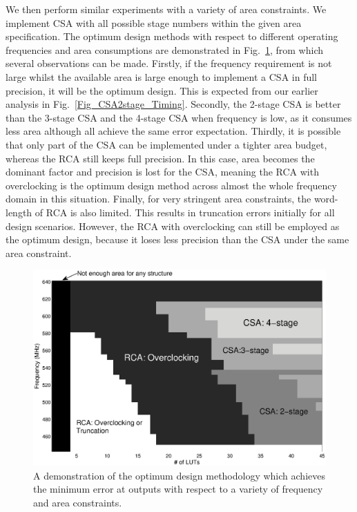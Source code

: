 \documentclass[prodmode,acmtrets]{acmsmall} %
\begin{document}
We then perform similar experiments with a variety of area constraints. We implement CSA with all possible stage numbers within the given area specification. The optimum design methods with respect to different operating frequencies and area consumptions are demonstrated in Fig.~\ref{Fig_CSA_Tradeoff}, from which several observations can be made. Firstly, if the frequency requirement is not large whilst the available area is large enough to implement a CSA in full precision, it will be the optimum design. This is expected from our earlier analysis in Fig.~\ref{Fig_CSA2stage_Timing}. Secondly, the 2-stage CSA is better than the 3-stage CSA and the 4-stage CSA when frequency is low, as it consumes less area although all achieve the same error expectation. Thirdly, it is possible that only part of the CSA can be implemented under a tighter area budget, whereas the RCA still keeps full precision. In this case, area becomes the dominant factor and precision is lost for the CSA, meaning the RCA with overclocking is the optimum design method across almost the whole frequency domain in this situation. Finally, for very stringent area constraints, the word-length of RCA is also limited. This results in truncation errors initially for all design scenarios. However, the RCA with overclocking can still be employed as the optimum design, because it loses less precision than the CSA under the same area constraint.
%
\begin{figure}[t]
  \centering
  \vspace{-2.5ex}
  \includegraphics[width=4.5in]{./Figures/Tradeoff_Freq.eps}
  \vspace{-2.5ex}
  \caption{A demonstration of the optimum design methodology which achieves the minimum error at outputs with respect to a variety of frequency and area constraints.}
  \label{Fig_CSA_Tradeoff}
\end{figure}
\end{document}
